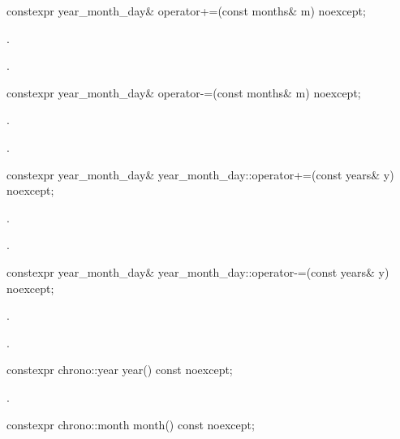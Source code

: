 %
\begin{itemdecl}
constexpr year_month_day& operator+=(const months& m) noexcept;
\end{itemdecl}

\begin{itemdescr}
\pnum
\effects {}.

\pnum
\returns {}.
\end{itemdescr}

%
\begin{itemdecl}
constexpr year_month_day& operator-=(const months& m) noexcept;
\end{itemdecl}

\begin{itemdescr}
\pnum
\effects {}.

\pnum
\returns {}.
\end{itemdescr}

%
\begin{itemdecl}
constexpr year_month_day& year_month_day::operator+=(const years& y) noexcept;
\end{itemdecl}

\begin{itemdescr}
\pnum
\effects {}.

\pnum
\returns {}.
\end{itemdescr}

%
\begin{itemdecl}
constexpr year_month_day& year_month_day::operator-=(const years& y) noexcept;
\end{itemdecl}

\begin{itemdescr}
\pnum
\effects {}.

\pnum
\returns {}.
\end{itemdescr}

%
\begin{itemdecl}
constexpr chrono::year year() const noexcept;
\end{itemdecl}

\begin{itemdescr}
\pnum
\returns {}.
\end{itemdescr}

%
\begin{itemdecl}
constexpr chrono::month month() const noexcept;
\end{itemdecl}

